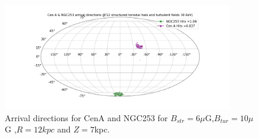 \documentclass[12pt, a4 paper]{article}
\begin{document}
\begin{figure}[h!]
    \includegraphics[width = 10cm]{Images/CenA_NGC253_Str_Tur_JF12_30EeV.png}
    \caption{Arrival directions for CenA and NGC253 for $B_{str} = 6\mu$G,$B_{tur} =10\mu$G ,$R = 12kpc$ and $Z = 7$kpc.}
    \label{fig:my_label}
\end{figure}
\restoregeometry

\newpage
{}   
\end{document}
